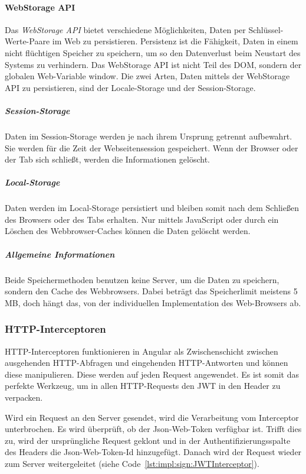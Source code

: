 \paragraph{WebStorage API}
\label{par:impl:usermanagment:WebStorage}
Das \emph{WebStorage API} bietet verschiedene Möglichkeiten, Daten per Schlüssel-Werte-Paare im Web zu persistieren. Persistenz ist die Fähigkeit, Daten in einem nicht flüchtigen Speicher zu speichern, um so den Datenverlust beim Neustart des Systems zu verhindern. Das WebStorage API ist nicht Teil des DOM, sondern der globalen Web-Variable window. Die zwei Arten, Daten mittels der WebStorage API zu persistieren, sind der Locale-Storage und der Session-Storage.
\cite{WikiPersistenzDefinition} \cite{WebStorageAPI}


\subparagraph{Session-Storage}
Daten im Session-Storage werden je nach ihrem Ursprung getrennt aufbewahrt. Sie werden für die Zeit der Webseitensession gespeichert. Wenn der Browser oder der Tab sich schließt, werden die Informationen gelöscht.
\cite{WebStorageAPI}

\subparagraph{Local-Storage}
Daten werden im Local-Storage persistiert und bleiben somit nach dem Schließen des Browsers oder des Tabs erhalten. Nur mittels JavaScript oder durch ein Löschen des Webbrowser-Caches können die Daten gelöscht werden.
\cite{WebStorageAPI}

\subparagraph{Allgemeine Informationen}
Beide Speichermethoden benutzen keine Server, um die Daten zu speichern, sondern den Cache des Webbrowsers. Dabei beträgt das Speicherlimit meistens 5 MB, doch hängt das, von der individuellen Implementation des Web-Browsers ab.
\cite{WebStorageAPI}

\subsubsection{HTTP-Interceptoren}
\label{sec:httpinterceptor}
HTTP-Interceptoren funktionieren in Angular als Zwischenschicht zwischen ausgehenden HTTP-Abfragen und eingehenden HTTP-Antworten und können diese manipulieren.
Diese werden auf jeden Request angewendet. Es ist somit das perfekte Werkzeug, um in allen HTTP-Requests den JWT in den Header zu verpacken.
\cite[10.3]{AngularBuch}

Wird ein Request an den Server gesendet, wird die Verarbeitung vom Interceptor unterbrochen. Es wird überprüft, ob der Json-Web-Token verfügbar ist. Trifft dies zu, wird der ursprüngliche Request geklont und in der Authentifizierungsspalte des Headers die Json-Web-Token-Id hinzugefügt. Danach wird der Request wieder zum Server weitergeleitet (siehe Code \ref{lst:impl:sign:JWTInterceptor}). 

